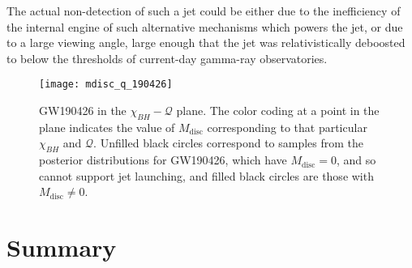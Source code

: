         The actual non-detection of such a jet could be either due to the inefficiency
        of the internal engine of such alternative mechanisms which powers the jet, or
        due to a large viewing angle, large enough that the jet was relativistically
        deboosted to below the thresholds of current-day gamma-ray observatories.


        \begin{figure}[H]
            \centering
            \texttt{[image: mdisc\_q\_190426]}
            \caption[GW190426 in the $\chi_{BH}-\mathcal{Q}$ plane]{
                GW190426 in the $\chi_{BH}-\mathcal{Q}$ plane. The color coding at a
                point in the plane indicates the value of $M_{\mathrm{disc}}$
                corresponding to that particular $\chi_{BH}$ and $\mathcal{Q}$.
                Unfilled black circles correspond to samples from the posterior
                distributions for GW190426, which have $M_{\mathrm{disc}} = 0$, and so
                cannot support jet launching, and filled black circles are those with
                $M_{\mathrm{disc}} \neq 0$.
            }
            \label{fig:mdisc_q_190426}
        \end{figure}



\section{Summary}
